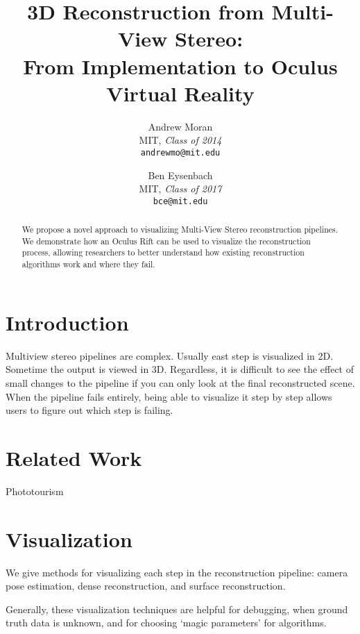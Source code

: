 \documentclass[10pt,twocolumn,letterpaper]{article}
\begin{document}
\title{3D Reconstruction from Multi-View Stereo:\\ From Implementation to Oculus Virtual Reality}

\author{Andrew Moran\\
  MIT, \textit{Class of 2014}\\
  {\tt\small andrewmo@mit.edu}
\and
Ben Eysenbach\\
MIT, \textit{Class of 2017}\\
{\tt\small bce@mit.edu}
}

\maketitle

\begin{abstract}
   We propose a novel approach to visualizing Multi-View Stereo reconstruction pipelines. We demonstrate how an Oculus Rift can be used to visualize the reconstruction process, allowing researchers to better understand how existing reconstruction algorithms work and where they fail.
\end{abstract}

\section{Introduction}
Multiview stereo pipelines are complex. Usually east step is visualized in 2D. Sometime the output is viewed in 3D. Regardless, it is difficult to see the effect of small changes to the pipeline if you can only look at the final reconstructed scene. When the pipeline fails entirely, being able to visualize it step by step allows users to figure out which step is failing.

\section{Related Work}
Phototourism

\section{Visualization}
We give methods for visualizing each step in the reconstruction pipeline: camera pose estimation, dense reconstruction, and surface reconstruction. 

Generally, these visualization techniques are helpful for debugging, when ground truth data is unknown, and for choosing `magic parameters' for algorithms.
\end{document}
